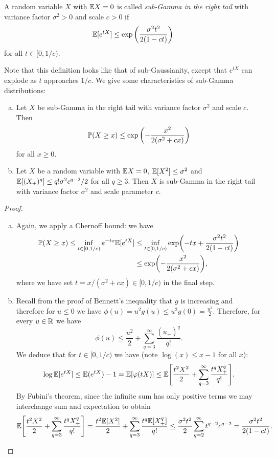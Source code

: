 \begin{definition}
	A random variable $X$ with $\mathbb E X = 0$ is called \emph{sub-Gamma in the right tail} with variance factor $\sigma^2 > 0$ and scale $c > 0$ if
	\[
	\mathbb E[e^{tX}] \leq \exp\qty(\frac{\sigma^2 t^2}{2(1 - ct)})
	\]
	for all $t \in [0, 1/c)$. 
\end{definition}

Note that this definition looks like that of sub-Gaussianity, except that $e^{tX}$ can explode as $t$ approaches $1/c$. We give some characteristics of sub-Gamma distributions:


\begin{proposition}
\begin{enumerate}[(a)]
\item Let $X$ be sub-Gamma in the right tail with variance factor $\sigma^2$ and scale $c$. Then 
\[
\mathbb P(X \geq x) \leq \exp\qty(-\frac{x^2}{2(\sigma^2 + cx)})
\]
for all $x \geq 0$.

\item Let $X$ be a random variable with $\mathbb E X = 0$, $\mathbb E[X^2] \leq \sigma^2$ and $\mathbb E[(X_+)^q] \leq q! \sigma^2 c^{q-2}/2$ for all $q \geq 3$. Then $X$ is sub-Gamma in the right tail with variance factor $\sigma^2$ and scale parameter $c$. 
\end{enumerate}
\end{proposition}

\begin{proof}
\begin{enumerate}[(a)]
\item Again, we apply a Chernoff bound: we have
\begin{align*}
\mathbb P(X \geq x) \leq \inf_{t \in [0, 1/c)} e^{-tx} \mathbb E[e^{tX}] &\leq \inf_{t \in [0, 1/c)} \exp(-tx + \frac{\sigma^2t^2}{2(1 - ct)}) \\
&\leq \exp(- \frac{x^2}{2(\sigma^2 + cx)}),
\end{align*}
where we have set $t = x/(\sigma^2 + cx) \in [0, 1/c)$ in the final step. 

\item Recall from the proof of Bennett's inequality that $g$ is increasing and therefore for $u \leq 0$ we have $\phi(u) = u^2 g(u) \leq u^2 g(0) = \frac{u^2}{2}$. Therefore, for every $u \in \mathbb R$ we have
\[
\phi(u) \leq \frac{u^2}{2} + \sum_{q=3}^\infty \frac{(u_+)^q}{q!}.
\]
We deduce that for $t \in [0, 1/c)$ we have (note $\log(x) \leq x - 1$ for all $x$):
\[
\log \mathbb E[e^{tX}] \leq \mathbb E(e^{tX}) - 1 = \mathbb E[\varphi(tX)] \leq \mathbb E \qty[\frac{t^2X^2}{2} + \sum_{q=3}^\infty \frac{t^q X_+^q}{q!}].
\]
By Fubini's theorem, since the infinite sum has only positive terms we may interchange sum and expectation to obtain
\[
\mathbb E \qty[\frac{t^2X^2}{2} + \sum_{q=3}^\infty \frac{t^q X_+^q}{q!}] =  \frac{t^2 \mathbb E[X^2]}{2} + \sum_{q=3}^\infty \frac{t^q \mathbb E[X_+^q]}{q!} \leq \frac{\sigma^2 t^2}{2} \sum_{q=2}^\infty t^{q-2} c^{q-2} = \frac{\sigma^2t^2}{2(1-ct)}. 
\]
\end{enumerate}
\end{proof}

